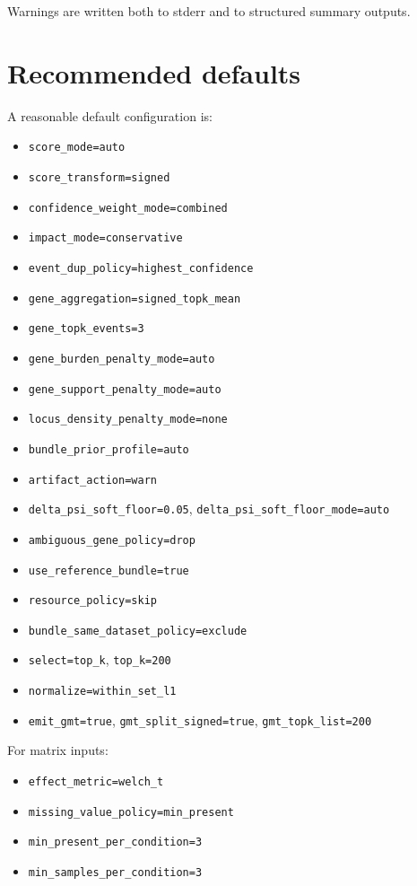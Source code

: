 \documentclass[11pt]{article}
\begin{document}
Warnings are written both to stderr and to structured summary outputs.

\section{Recommended defaults}
A reasonable default configuration is:
\begin{itemize}[leftmargin=2em]
\item \texttt{score\_mode=auto}
\item \texttt{score\_transform=signed}
\item \texttt{confidence\_weight\_mode=combined}
\item \texttt{impact\_mode=conservative}
\item \texttt{event\_dup\_policy=highest\_confidence}
\item \texttt{gene\_aggregation=signed\_topk\_mean}
\item \texttt{gene\_topk\_events=3}
\item \texttt{gene\_burden\_penalty\_mode=auto}
\item \texttt{gene\_support\_penalty\_mode=auto}
\item \texttt{locus\_density\_penalty\_mode=none}
\item \texttt{bundle\_prior\_profile=auto}
\item \texttt{artifact\_action=warn}
\item \texttt{delta\_psi\_soft\_floor=0.05}, \texttt{delta\_psi\_soft\_floor\_mode=auto}
\item \texttt{ambiguous\_gene\_policy=drop}
\item \texttt{use\_reference\_bundle=true}
\item \texttt{resource\_policy=skip}
\item \texttt{bundle\_same\_dataset\_policy=exclude}
\item \texttt{select=top\_k}, \texttt{top\_k=200}
\item \texttt{normalize=within\_set\_l1}
\item \texttt{emit\_gmt=true}, \texttt{gmt\_split\_signed=true}, \texttt{gmt\_topk\_list=200}
\end{itemize}

For matrix inputs:
\begin{itemize}[leftmargin=2em]
\item \texttt{effect\_metric=welch\_t}
\item \texttt{missing\_value\_policy=min\_present}
\item \texttt{min\_present\_per\_condition=3}
\item \texttt{min\_samples\_per\_condition=3}
\end{itemize}
\end{document}
